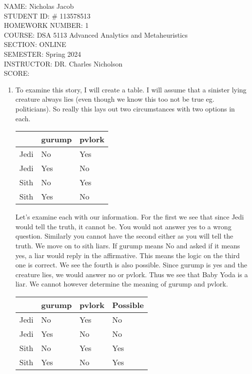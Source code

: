 \documentclass[11pt]{article}
\author{}
\title{}
\begin{document}
{\Large
\noindent NAME:  Nicholas Jacob\\ 
STUDENT ID: \# 113578513\\
HOMEWORK NUMBER: 1\\
COURSE: DSA 5113 Advanced Analytics and Metaheuristics\\ 
SECTION: ONLINE\\SEMESTER: Spring 2024\\
INSTRUCTOR:  DR. Charles Nicholson\\
 SCORE:}

\newpage
\begin{enumerate}
\item To examine this story, I will create a table.  I will assume that a sinister lying creature always lies (even though we know this too not be true eg. politicians).  So really this lays out two circumstances with two options in each.  

\begin{tabular}{l|l|l}
&gurump&pvlork\\ \hline
Jedi&No& Yes\\
Jedi& Yes&No\\
Sith &No & Yes\\
Sith & Yes &No

\end{tabular}

Let's examine each with our information.  For the first we see that since Jedi would tell the truth, it cannot be.  You would not answer yes to a wrong question.  Similarly you cannot have the second either as you will tell the truth.  We move on to sith liars.  If gurump means No and asked if it means yes, a liar would reply in the affirmative.  This means the logic on the third one is correct.  We see the fourth is also possible.  Since gurump is yes and the creature lies, we would answer no or pvlork.  Thus we see that Baby Yoda is a liar.  We cannot however determine the meaning of gurump and pvlork.

\begin{tabular}{l|l|l|l}
&gurump&pvlork&Possible\\ \hline
Jedi&No& Yes& No\\
Jedi& Yes&No& No\\
Sith &No & Yes& Yes\\
Sith & Yes &No&Yes

\end{tabular}

\end{enumerate}
\end{document}
